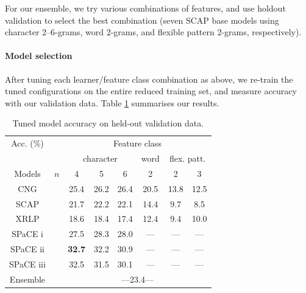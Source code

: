 \documentclass[twocolumn,10pt]{article}
\begin{document}
For our ensemble, we try various combinations of features, and use
holdout validation to select the best combination
(seven SCAP base models using character 2--6-grams, word 2-grams,
and flexible pattern 2-grams, respectively).


\paragraph{Model selection}
After tuning each learner/feature class combination as above,
we re-train the tuned configurations on the entire reduced
training set, and measure accuracy with our validation data.
Table \ref{tab:devresults} summarises our results.

\begin{table}[h]
\centering
\begin{tabular}{@{}cccccccc@{}}
\cmidrule{3-8}
Acc. (\%)   &     & \multicolumn{6}{c}{Feature class}                    \\
\cmidrule{3-8} 
            &     & \multicolumn{3}{c}{character} & word  & \multicolumn{2}{c}{flex. patt.} \\
\cmidrule(r){1-1} \cmidrule(rl){3-5} \cmidrule(rl){6-6} \cmidrule(rl){7-8} 
Models      & $n$ & 4      & 5      & 6           & 2     & 2     & 3    \\
\cmidrule(r){1-1} \cmidrule{3-8} 
CNG         &     & 25.4   & 26.2   & 26.4        & 20.5  & 13.8  & 12.5 \\
SCAP        &     & 21.7   & 22.2   & 22.1        & 14.4  &  9.7  &  8.5 \\
XRLP        &     & 18.6   & 18.4   & 17.4        & 12.4  &  9.4  & 10.0 \\
SPaCE i     &     & 27.5   & 28.3   & 28.0        & ---   & ---   & ---  \\
SPaCE ii    & &{\bf 32.7}  & 32.2   & 30.9        & ---   & ---   & ---  \\
SPaCE iii   &     & 32.5   & 31.5   & 30.1        & ---   & ---   & ---  \\
                  \cmidrule{3-8} 
Ensemble    &     & \multicolumn{6}{c}{ ---23.4--- }\\ %
\bottomrule
\end{tabular}
\caption{Tuned model accuracy on held-out validation data.}
\label{tab:devresults}
\end{table}
\end{document}
